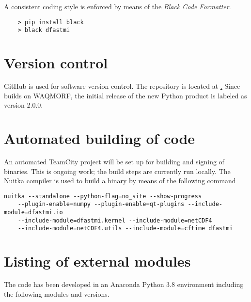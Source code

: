 A consistent coding style is enforced by means of the \emph{Black Code Formatter}.

\begin{Verbatim}
    > pip install black
    > black dfastmi
\end{Verbatim}

\section{Version control}

GitHub is used for software version control.
The repository is located at \href{https://github.com/Deltares/D-FAST_Morphological_Impact}.
Since \dfastmi builds on WAQMORF, the initial release of the new Python product is labeled as version 2.0.0.

\section{Automated building of code}

An automated TeamCity project will be set up for building and signing of binaries.
This is ongoing work; the build steps are currently run locally.
The Nuitka compiler is used to build a binary by means of the following command

\begin{Verbatim}
nuitka --standalone --python-flag=no_site --show-progress
    --plugin-enable=numpy --plugin-enable=qt-plugins --include-module=dfastmi.io
    --include-module=dfastmi.kernel --include-module=netCDF4
    --include-module=netCDF4.utils --include-module=cftime dfastmi
\end{Verbatim}

\section{Listing of external modules}

The code has been developed in an Anaconda Python 3.8 environment including the following modules and versions.

